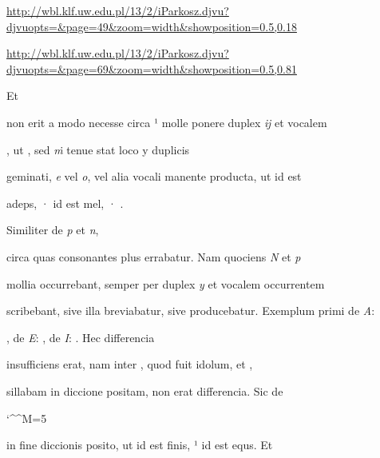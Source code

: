 
\newParkoszpage


{
\url{http://wbl.klf.uw.edu.pl/13/2/iParkosz.djvu?djvuopts=&page=49&zoom=width&showposition=0.5,0.18}

\url{http://wbl.klf.uw.edu.pl/13/2/iParkosz.djvu?djvuopts=&page=69&zoom=width&showposition=0.5,0.81}
}


\fullpreviouslines


{
\color{blue}
Et

}


\fulllines
{}
non erit a modo necesse circa ¹ molle ponere duplex \textit{ĳ} et vocalem 

, ut  , sed \textit{ṁ} tenue stat loco y duplicis

geminati, \textit{e} vel \textit{o}, vel alia vocali manente producta, ut  id est

\splitlines
adeps, ·  id est mel, · .

\indentK Similiter de \textit{p} et \textit{n},

\fulllines
circa quas consonantes plus errabatur. Nam quociens \textit{N} et \textit{p} 

mollia occurrebant, semper per duplex \textit{y} et vocalem occurrentem 

scribebant, sive illa breviabatur, sive producebatur. Exemplum primi de \textit{A}: 

, de \textit{E}: , de \textit{I}: . Hec differencia 

insufficiens erat, nam inter , quod fuit idolum, et , 

sillabam in diccione  positam, non erat differencia. Sic de 

\catcode `\^^M=5


\obeylines

 in fine diccionis posito, ut  id est finis, ¹ id est equs. Et 

